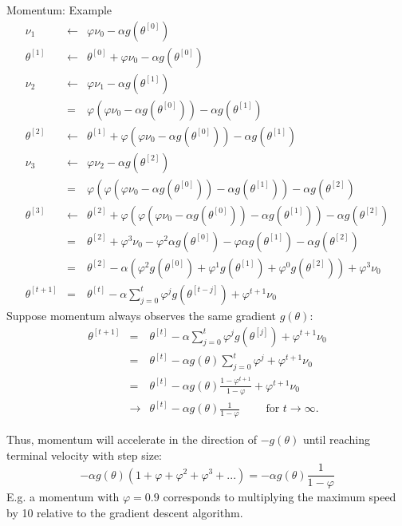 \begin{vbframe}{Momentum: Example}
  \footnotesize 
  \begin{eqnarray*}
    \nu_{1} &\leftarrow& \varphi \nu_0 - \alpha g(\theta^{[0]}) \\[0.1cm]
    \theta^{[1]} &\leftarrow& \theta^{[0]} + \varphi \nu_0 - \alpha g(\theta^{[0]}) \\[0.1cm]
    \nu_{2} &\leftarrow& \varphi \nu_1 - \alpha g(\theta^{[1]}) \\
            &=& \varphi (\varphi \nu_0 - \alpha g(\theta^{[0]})) - \alpha g(\theta^{[1]}) \\[0.1cm]
    \theta^{[2]} &\leftarrow& \theta^{[1]} + \varphi (\varphi \nu_0 - \alpha g(\theta^{[0]})) - \alpha g(\theta^{[1]}) \\[0.1cm]
    \nu_{3} &\leftarrow& \varphi \nu_2 - \alpha g(\theta^{[2]}) \\
            &=& \varphi (\varphi (\varphi \nu_0 - \alpha g(\theta^{[0]})) - \alpha g(\theta^{[1]})) - \alpha g(\theta^{[2]}) \\[0.1cm]
    \theta^{[3]} &\leftarrow& \theta^{[2]} + \varphi (\varphi (\varphi \nu_0 - \alpha g(\theta^{[0]})) - \alpha g(\theta^{[1]})) - \alpha g(\theta^{[2]}) \\
            &=& \theta^{[2]} + \varphi^3\nu_0 - \varphi^2\alpha g(\theta^{[0]}) - \varphi \alpha g(\theta^{[1]}) - \alpha g(\theta^{[2]}) \\
            &=& \theta^{[2]} - \alpha(\varphi^2g(\theta^{[0]}) + \varphi^1g(\theta^{[1]}) + \varphi^0g(\theta^{[2]})) + \varphi^3 \nu_0 \\
\theta^{[t+1]} &=& \theta^{[t]} - \alpha \displaystyle\sum_{j = 0}^{t} \varphi^j g(\theta^{[t - j]}) + \varphi^{t+1}\nu_0
  \end{eqnarray*}
Suppose momentum always observes the same gradient $g(\theta)$:
  \footnotesize 
  \begin{eqnarray*}
    \theta^{[t+1]} &=& \theta^{[t]} - \alpha \displaystyle\sum_{j = 0}^{t} \varphi^j g(\theta^{[j]}) + \varphi^{t+1}\nu_0 \\
                 &=& \theta^{[t]} - \alpha g(\theta) \displaystyle\sum_{j = 0}^{t} \varphi^j + \varphi^{t+1}\nu_0 \\
                 &=& \theta^{[t]} - \alpha g(\theta) \frac{1 - \varphi^{t+1}}{1 - \varphi} + \varphi^{t+1} \nu_0 \\
                 &\to& \theta^{[t]} - \alpha g(\theta) \frac{1}{1 - \varphi} \qquad \text{ for } t \to \infty. 
  \end{eqnarray*}

Thus, momentum will accelerate in the direction of $-g(\theta)$ until reaching terminal velocity with step size: 
    $$-\alpha g(\theta)(1 + \varphi + \varphi^2 + \varphi^3 + ...) = -\alpha g(\theta) \frac{1}{1 - \varphi}$$
E.g. a momentum with $\varphi = 0.9$ corresponds to multiplying the maximum speed by 10 relative to the gradient descent algorithm. 
\end{vbframe}


